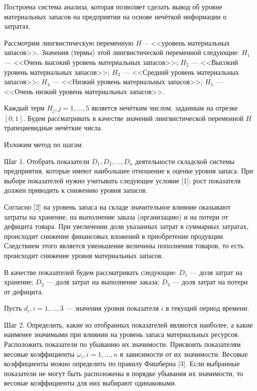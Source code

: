 
\vzmscaption

Построена система анализа, которая позволяет сделать вывод об уровне материальных запасов на предприятии на основе нечёткой информации о затратах.

Рассмотрим лингвистическую переменную $H$--- <<уровень материальных запасов>>. Значения (термы) этой лингвистической переменной следующие:
$H_{1}$ --- <<Очень высокий уровень материальных запасов>>;
$H_{2}$ --- <<Высокий уровень материальных запасов>>;
$H_{3}$ --- <<Средний уровень материальных запасов>>;
$H_{4}$ --- <<Низкий уровень материальных запасов>>;
$H_{5}$ --- <<Очень низкий уровень материальных запасов>>.


Каждый терм $H_{j}, j = 1, \ldots, 5$ является нечётким числом, заданным на отрезке $[0; 1]$. Будем рассматривать в качестве значений лингвистической переменной $H$ трапециевидные нечёткие числа.

Изложим метод по шагам.

Шаг 1. Отобрать показатели $D_{1}, D_{2}, \ldots, D_{n}$ деятельности складской системы предприятия, которые имеют наибольшее отношение к оценке уровня запаса. При выборе показателей нужно учитывать следующее условие [1]: рост показателя должен приводить к снижению уровня запасов.

Согласно [2] на уровень запаса на складе значительное влияние оказывают затраты на хранение, на выполнение заказа (организацию) и на потери от дефицита товара. При увеличении доли указанных затрат в суммарных затратах, происходит снижение финансовых вложений в приобретение продукции. Следствием этого является уменьшение величины пополнения товаров, то есть происходит снижение уровня материальных запасов.

В качестве показателей будем рассматривать следующие:
$D_{1}$ --- доля затрат на хранение;
$D_{2}$ --- доля затрат на выполнение заказа;
$D_{3}$ --- доля затрат на потери от дефицита.

Пусть $d_{i}, i = 1, \ldots, 3$ --- значения уровня показателя $i$ в текущий период времени.

Шаг 2.
Определить, какие из отобранных показателей являются наиболее, а какие наименее значимыми при влиянии на уровень запаса материальных ресурсов. Расположить показатели по убыванию их значимости.
Присвоить показателям весовые коэффициенты $\omega_{i}, i = 1, \ldots, n$ в зависимости от их значимости.
Весовые коэффициенты можно определить по правилу Фишберна [3].
Если выбранные показатели не могут быть расположены в порядке убывания их значимости, то весовые коэффициенты для них выбирают одинаковыми.

